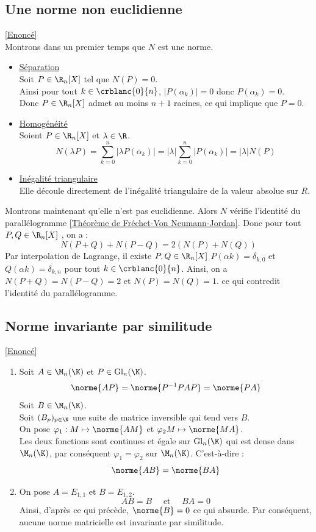 \documentclass{book}
\begin{document}
	\subsection{Une norme non euclidienne}\label{sec:une-norme-non-euclidienne}
		\textcolor{blue}{\hyperref[Une norme non euclidienne]{[Enoncé]}}\\
	Montrons dans un premier temps que $N$ est une norme.\\
	\begin{itemize}
		\item \underline{Séparation}\\ Soit $P\in\R_n[X]$ tel que $N(P)=0$.\\
		Ainsi pour tout $k\in\crblanc{0}{n}$, $|P(\alpha_k)|=0$ donc $P(\alpha_k)=0$.\\
		Donc $P\in\R_n[X]$ admet au moins $n+1$ racines, ce qui implique que $P=0$.
		\item \underline{Homogénéité}\\ Soient $P\in\R_n[X]$ et $\lambda\in \R$.\\
		\[N(\lambda P)=\sum_{k=0}^{n}|\lambda P(\alpha_k)|=|\lambda|\sum_{k=0}^{n}|P(\alpha_k)|=|\lambda|N(P)\]
		\item \underline{Inégalité triangulaire}\\ Elle découle directement de l'inégalité triangulaire de la valeur absolue sur $R$.
	\end{itemize}
	Montrons maintenant qu'elle n'est pas euclidienne.
	Alors $N$ vérifie l'identité du parallélogramme \ref{Théorème de Fréchet-Von Neumann-Jordan}.
	Donc pour tout $P,Q\in\R_n[X]$ , on a : \[N(P+Q)+N(P-Q)=2(N(P)+N(Q))\]
	Par interpolation de Lagrange, il existe $P, Q\in\R_n[X]$ $P(\alpha k) = \delta_{k,0}$ et $Q(\alpha k) = \delta_{k,n}$ pour tout $k\in\crblanc{0}{n}$.
	Ainsi, on a $N(P+Q)=N(P-Q)=2$ et $N(P)=N(Q)=1$. ce qui contredit l'identité du parallélogramme.
	\subsection{Norme invariante par similitude}\label{sec:norme-invariante-par-similitude}
		\textcolor{blue}{\hyperref[Norme invariante par similitude]{[Enoncé]}}\\
		\begin{enumerate}
			\item Soit $A\in\M_n(\K)$ et $P\in\text{Gl}_n(\K)$.\\
			\[\norme{AP}=\norme{P^{-1}PAP}=\norme{PA}\]
			Soit $B\in\M_n(\K)$.\\
			Soit $(B_p)_{p\in\N}$ une suite de matrice inversible qui tend vers $B$.\\
			On pose $\varphi_1:M\mapsto\norme{AM}$ et $\varphi_2 M\mapsto \norme{MA}$.\\
			Les deux fonctions sont continues et égale sur $\text{Gl}_n(\K)$ qui est dense dans $\M_n(\K)$, par conséquent $\varphi_1=\varphi_2$ sur $\M_n(\K)$.
			C'est-à-dire :
			\[\norme{AB}=\norme{BA}\]
			\item On pose $A=E_{1,1}$ et $B=E_{1,2}$.\\
			\[AB=B\quad\text{ et }\quad BA=0\]
			Ainsi, d'après ce qui précède, $\norme{B}=0$ ce qui absurde.
			Par conséquent, aucune norme matricielle est invariante par similitude.
		\end{enumerate}
\end{document}
